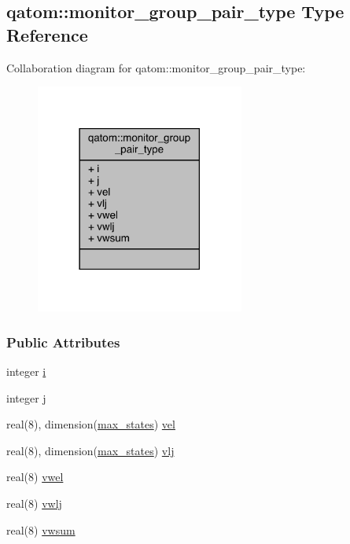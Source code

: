 \hypertarget{structqatom_1_1monitor__group__pair__type}{\subsection{qatom\-:\-:monitor\-\_\-group\-\_\-pair\-\_\-type Type Reference}
\label{structqatom_1_1monitor__group__pair__type}
}


Collaboration diagram for qatom\-:\-:monitor\-\_\-group\-\_\-pair\-\_\-type\-:
\nopagebreak
\begin{figure}[H]
\begin{center}
\leavevmode
\includegraphics[width=194pt]{structqatom_1_1monitor__group__pair__type__coll__graph}
\end{center}
\end{figure}
\subsubsection*{Public Attributes}
\begin{DoxyCompactItemize}
\item 
integer \hyperlink{structqatom_1_1monitor__group__pair__type_a78170d96a97b9e71422008ce82f5d6fa}{i}
\item 
integer \hyperlink{structqatom_1_1monitor__group__pair__type_a2a87bd4d819b0474ebdfc19c67b84afa}{j}
\item 
real(8), dimension(\hyperlink{classqatom_ad89179e7bcdef29e13211330d1b8fd20}{max\-\_\-states}) \hyperlink{structqatom_1_1monitor__group__pair__type_a1324bdf050d7a0fc7e2eb708cf317d02}{vel}
\item 
real(8), dimension(\hyperlink{classqatom_ad89179e7bcdef29e13211330d1b8fd20}{max\-\_\-states}) \hyperlink{structqatom_1_1monitor__group__pair__type_a3532172c6c4866e68abb516e4b9e0329}{vlj}
\item 
real(8) \hyperlink{structqatom_1_1monitor__group__pair__type_ab512a5f5e7c8015b25738d21f137c22f}{vwel}
\item 
real(8) \hyperlink{structqatom_1_1monitor__group__pair__type_aad20fd34531692f1b03ab7aa40e5edc4}{vwlj}
\item 
real(8) \hyperlink{structqatom_1_1monitor__group__pair__type_a1e9047683fbeef69a80167891938fd0a}{vwsum}
\end{DoxyCompactItemize}


